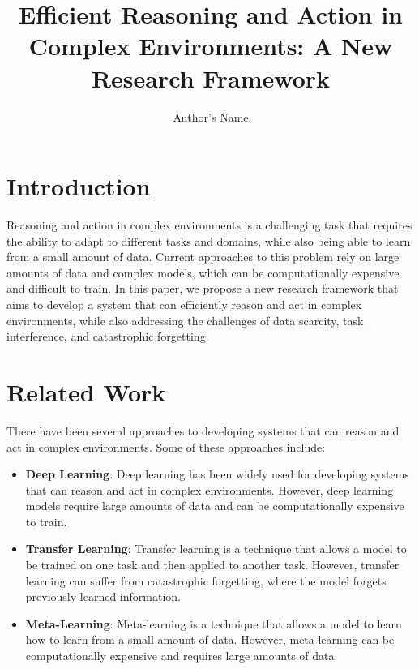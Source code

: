 \documentclass{article}
\begin{document}
\title{Efficient Reasoning and Action in Complex Environments: A New Research Framework}

\author{Author's Name}


\section{Introduction}

Reasoning and action in complex environments is a challenging task that requires the ability to adapt to different tasks and domains, while also being able to learn from a small amount of data. Current approaches to this problem rely on large amounts of data and complex models, which can be computationally expensive and difficult to train. In this paper, we propose a new research framework that aims to develop a system that can efficiently reason and act in complex environments, while also addressing the challenges of data scarcity, task interference, and catastrophic forgetting.

\section{Related Work}

There have been several approaches to developing systems that can reason and act in complex environments. Some of these approaches include:

\begin{itemize}
\item \textbf{Deep Learning}: Deep learning has been widely used for developing systems that can reason and act in complex environments. However, deep learning models require large amounts of data and can be computationally expensive to train.
\item \textbf{Transfer Learning}: Transfer learning is a technique that allows a model to be trained on one task and then applied to another task. However, transfer learning can suffer from catastrophic forgetting, where the model forgets previously learned information.
\item \textbf{Meta-Learning}: Meta-learning is a technique that allows a model to learn how to learn from a small amount of data. However, meta-learning can be computationally expensive and requires large amounts of data.
\end{itemize}
\end{document}
